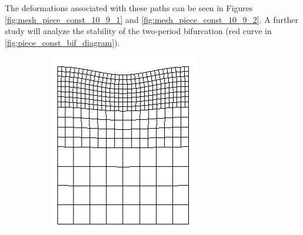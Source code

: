 \documentclass[11pt]{report}
\begin{document}
The deformations associated with these paths can be seen in Figures
\ref{fig:mesh_piece_const_10_9_1} and \ref{fig:mesh_piece_const_10_9_2}. A further study will analyze the stability of the two-period bifurcation (red curve in \ref{fig:piece_const_bif_diagram}).
\begin{figure}[!htb]
\begin{center}
	\begin{subfigure}[b]{0.22\textwidth}
		\includegraphics[width=\textwidth]{mesh/mesh_piece_const_10_9_1_low}
	\end{subfigure}
	\begin{subfigure}[b]{0.22\textwidth}

\end{subfigure}
\end{center}
\end{figure}
\end{document}

